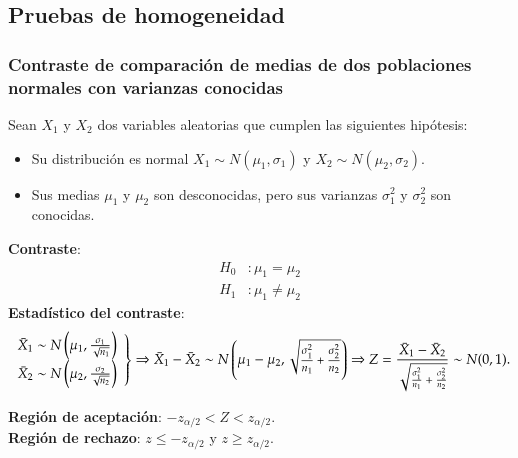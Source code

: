 \subsection{Pruebas de homogeneidad}
\begin{frame}
\frametitle{Contraste de comparación de medias de dos poblaciones normales con varianzas conocidas}
Sean $X_1$ y $X_2$ dos variables aleatorias que cumplen las siguientes hipótesis:
\begin{itemize}
\item Su distribución es normal $X_1\sim N(\mu_1,\sigma_1)$ y $X_2\sim N(\mu_2,\sigma_2)$.
\item Sus medias $\mu_1$ y $\mu_2$ son desconocidas, pero sus varianzas $\sigma^2_1$ y $\sigma^2_2$ son conocidas.
\end{itemize}
\textbf{Contraste}:
\begin{align*} 
H_0 &: \mu_1=\mu_2\\
H_1 &: \mu_1\neq \mu_2
\end{align*}
\textbf{Estadístico del contraste}:
{\footnotesize
\[
\left.
\begin{array}{l}
\bar{X}_1\sim N\left(\mu_1,\frac{\sigma_1}{\sqrt{n_1}} \right)\\
\bar{X}_2\sim N\left(\mu_2,\frac{\sigma_2}{\sqrt{n_2}} \right)
\end{array}
\right\}
\footnotesize
\Rightarrow
\bar{X}_1-\bar{X}_2 \sim N\left(\mu_1-\mu_2,\sqrt{\frac{\sigma^2_1}{n_1}+\frac{\sigma^2_2}{n_2}}\right)
\Rightarrow Z= \frac{\bar{X}_1-\bar{X}_2}{\sqrt{\frac{\sigma^2_1}{n_1}+\frac{\sigma^2_2}{n_2}}}\sim
N(0,1).
\]
}

\textbf{Región de aceptación}: $-z_{\alpha/2}< Z < z_{\alpha/2}$.\\
\textbf{Región de rechazo}: $z\leq -z_{\alpha/2}$ y $z\geq z_{\alpha/2}$.
\end{frame}


